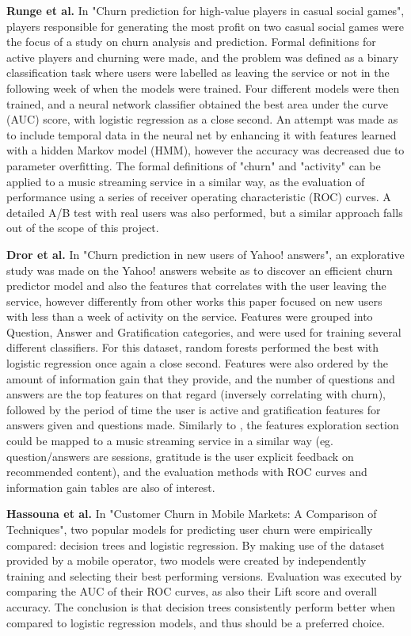 \documentclass{kththesis}
\begin{document}
\textbf{Runge et al.} \citep{Runge2014} In "Churn prediction for high-value players in casual social games", players responsible for generating the most profit on two casual social games were the focus of a study on churn analysis and prediction. Formal definitions for active players and churning were made, and the problem was defined as a binary classification task where users were labelled as leaving the service or not in the following week of when the models were trained. Four different models were then trained, and a neural network classifier obtained the best area under the curve (AUC) score, with logistic regression as a close second. An attempt was made as to include temporal data in the neural net by enhancing it with features learned with a hidden Markov model (HMM), however the accuracy was decreased due to parameter overfitting. The formal definitions of "churn" and "activity" can be applied to a music streaming service in a similar way, as the evaluation of performance using a series of receiver operating characteristic (ROC) curves. A detailed A/B test with real users was also performed, but a similar approach falls out of the scope of this project.

\textbf{Dror et al.} \citep{Dror2012} In "Churn prediction in new users of Yahoo! answers", an explorative study was made on the Yahoo! answers website as to discover an efficient churn predictor model and also the features that correlates with the user leaving the service, however differently from other works this paper focused on new users with less than a week of activity on the service. Features were grouped into Question, Answer and Gratification categories, and were used for training several different classifiers. For this dataset, random forests performed the best with logistic regression once again a close second. Features were also ordered by the amount of information gain that they provide, and the number of questions and answers are the top features on that regard (inversely correlating with churn), followed by the period of time the user is active and gratification features for answers given and questions made. Similarly to \citep{Pudipeddi2014}, the features exploration section could be mapped to a music streaming service in a similar way (eg. question/answers are sessions, gratitude is the user explicit feedback on recommended content), and the evaluation methods with ROC curves and information gain tables are also of interest. 

\textbf{Hassouna et al.} \citep{Hassouna2015} In "Customer Churn in Mobile Markets: A Comparison of Techniques", two popular models for predicting user churn were empirically compared: decision trees and logistic regression. By making use of the dataset provided by a mobile operator, two models were created by independently training and selecting their best performing versions. Evaluation was executed by comparing the AUC of their ROC curves, as also their Lift score and overall accuracy. The conclusion is that decision trees consistently perform better when compared to logistic regression models, and thus should be a preferred choice.
\end{document}
